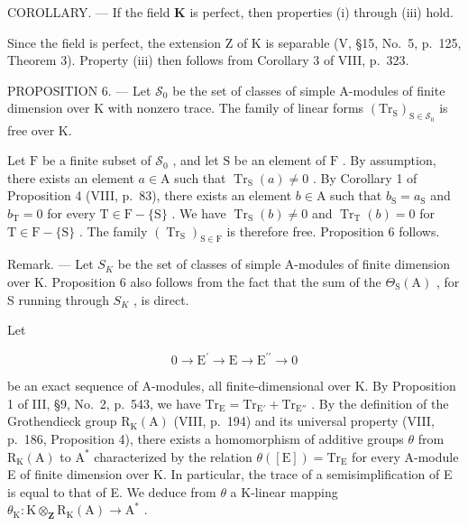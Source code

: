 COROLLARY. --- If the field \(\mathbf{K}\) is perfect, then properties (i) through (iii) hold.

Since the field is perfect, the extension Z of K is separable (V, §15, No.~5, p.~125, Theorem 3). Property (iii) then follows from Corollary 3 of VIII, p.~323.

PROPOSITION 6. --- Let \(\mathcal{S}_0\) be the set of classes of simple A-modules of finite dimension over K with nonzero trace. The family of linear forms \((\mathrm{Tr}_{\mathrm{S}})_{\mathrm{S}\in \mathcal{S}_0}\) is free over K.

Let \(\mathrm{F}\) be a finite subset of \(\mathcal{S}_0\) , and let \(\mathrm{S}\) be an element of \(\mathrm{F}\) . By assumption, there exists an element \(a \in \mathrm{A}\) such that \(\operatorname{Tr}_{\mathrm{S}}(a) \neq 0\) . By Corollary 1 of Proposition 4 (VIII, p.~83), there exists an element \(b \in \mathrm{A}\) such that \(b_{\mathrm{S}} = a_{\mathrm{S}}\) and \(b_{\mathrm{T}} = 0\) for every \(\mathrm{T} \in \mathrm{F} - \{\mathrm{S}\}\) . We have \(\operatorname{Tr}_{\mathrm{S}}(b) \neq 0\) and \(\operatorname{Tr}_{\mathrm{T}}(b) = 0\) for \(\mathrm{T} \in \mathrm{F} - \{\mathrm{S}\}\) . The family \((\operatorname{Tr}_{\mathrm{S}})_{\mathrm{S} \in \mathrm{F}}\) is therefore free. Proposition 6 follows.

Remark. --- Let \(S_{K}\) be the set of classes of simple A-modules of finite dimension over K. Proposition 6 also follows from the fact that the sum of the \(\Theta_{\mathrm{S}}(\mathrm{A})\) , for S running through \(S_{K}\) , is direct.

Let

\[
0 \longrightarrow \mathrm{E} ^ {\prime} \longrightarrow \mathrm{E} \longrightarrow \mathrm{E} ^ {\prime \prime} \longrightarrow 0
\]

be an exact sequence of A-modules, all finite-dimensional over K. By Proposition 1 of III, §9, No.~2, p.~543, we have \(\mathrm{Tr}_{\mathrm{E}} = \mathrm{Tr}_{\mathrm{E}'} + \mathrm{Tr}_{\mathrm{E}''}\) . By the definition of the Grothendieck group \(\mathrm{R}_{\mathrm{K}}(\mathrm{A})\) (VIII, p.~194) and its universal property (VIII, p.~186, Proposition 4), there exists a homomorphism of additive groups \(\theta\) from \(\mathrm{R}_{\mathrm{K}}(\mathrm{A})\) to \(\mathrm{A}^*\) characterized by the relation \(\theta([\mathrm{E}]) = \mathrm{Tr}_{\mathrm{E}}\) for every A-module E of finite dimension over K. In particular, the trace of a semisimplification of E is equal to that of E. We deduce from \(\theta\) a K-linear mapping \(\theta_{\mathrm{K}}: \mathrm{K} \otimes_{\mathbf{Z}} \mathrm{R}_{\mathrm{K}}(\mathrm{A}) \to \mathrm{A}^*\) .

